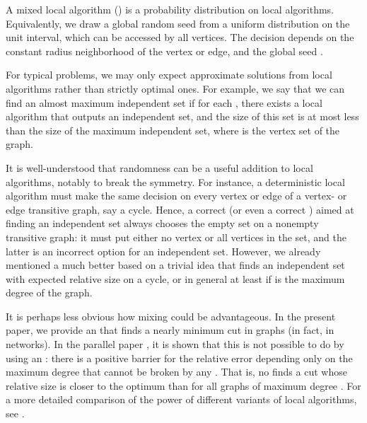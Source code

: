 \documentclass[12pt,a4paper]{article}
\renewcommand{\:}{\colon}
\begin{document}
A mixed local algorithm () is a probability distribution on local algorithms. 
Equivalently, we draw a global random seed  from a uniform distribution on the unit interval, which can be accessed by all vertices. 
The decision depends on the constant radius neighborhood of the vertex or edge, and the global seed . 


For typical problems, we may only expect approximate solutions from local algorithms rather than strictly optimal ones. 
For example, we say that we can find an almost maximum independent set if for each , there exists a local algorithm that outputs an independent set, and the size of this set is at most  less than the size of the maximum independent set, where  is the vertex set of the graph. 

It is well-understood that randomness can be a useful addition to local algorithms, notably to break the symmetry. 
For instance, a deterministic local algorithm must make the same decision on every vertex or edge of a vertex- or edge transitive graph, say a cycle. 
Hence, a correct  (or even a correct ) aimed at finding an independent set always chooses the empty set on a nonempty transitive graph: it must put either no vertex or all vertices in the set, and the latter is an incorrect option for an independent set. 
However, we already mentioned a much better  based on a trivial idea that finds an independent set with expected relative size  on a cycle, or in general at least  if  is the maximum degree of the graph. 

It is perhaps less obvious how mixing could be advantageous. 
In the present paper, we provide an  that finds a nearly minimum cut in graphs (in fact, in networks). 
In the parallel paper \cite{Csoka}, it is shown that this is not possible to do by using an : there is a positive barrier  for the relative error depending only on the maximum degree  that cannot be broken by any . 
That is, no  finds a cut whose relative size is closer to the optimum than  for all graphs of maximum degree . 
For a more detailed comparison of the power of different variants of local algorithms, see \cite{Csoka}. 
\end{document}
